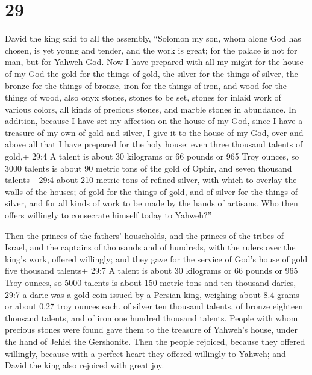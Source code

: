 \hypertarget{section-28}{%
\section{29}\label{section-28}}

 David the king said to all the assembly, ``Solomon my son,
whom alone God has chosen, is yet young and tender, and the work is
great; for the palace is not for man, but for Yahweh God. 
Now I have prepared with all my might for the house of my God the gold
for the things of gold, the silver for the things of silver, the bronze
for the things of bronze, iron for the things of iron, and wood for the
things of wood, also onyx stones, stones to be set, stones for inlaid
work of various colors, all kinds of precious stones, and marble stones
in abundance.  In addition, because I have set my affection
on the house of my God, since I have a treasure of my own of gold and
silver, I give it to the house of my God, over and above all that I have
prepared for the holy house:  even three thousand talents of
gold,+ 29:4 A talent is about 30 kilograms or 66 pounds or 965 Troy
ounces, so 3000 talents is about 90 metric tons of the gold of Ophir,
and seven thousand talents+ 29:4 about 210 metric tons of refined
silver, with which to overlay the walls of the houses;  of
gold for the things of gold, and of silver for the things of silver, and
for all kinds of work to be made by the hands of artisans. Who then
offers willingly to consecrate himself today to Yahweh?''

 Then the princes of the fathers' households, and the
princes of the tribes of Israel, and the captains of thousands and of
hundreds, with the rulers over the king's work, offered willingly;
 and they gave for the service of God's house of gold five
thousand talents+ 29:7 A talent is about 30 kilograms or 66 pounds or
965 Troy ounces, so 5000 talents is about 150 metric tons and ten
thousand darics,+ 29:7 a daric was a gold coin issued by a Persian king,
weighing about 8.4 grams or about 0.27 troy ounces each. of silver ten
thousand talents, of bronze eighteen thousand talents, and of iron one
hundred thousand talents.  People with whom precious stones
were found gave them to the treasure of Yahweh's house, under the hand
of Jehiel the Gershonite.  Then the people rejoiced, because
they offered willingly, because with a perfect heart they offered
willingly to Yahweh; and David the king also rejoiced with great joy.

